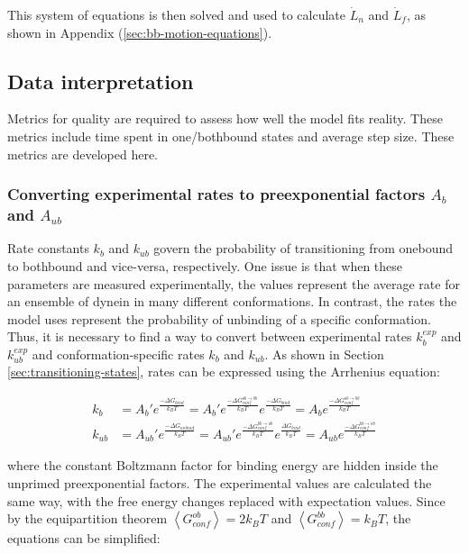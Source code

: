 \documentclass[10pt]{article} %
\begin{document}
This system of equations is then solved and used to calculate $\dot{L}_n$ and $\dot{L}_f$, as shown in Appendix (\ref{sec:bb-motion-equations}).

\subsection{Data interpretation}
Metrics for quality are required to assess how well the model fits reality. These metrics include time spent in one/bothbound states and average step size. These metrics are developed here.\\

\subsubsection{Converting experimental rates to preexponential factors $A_b$ and $A_{ub}$}
Rate constants $k_b$ and $k_{ub}$ govern the probability of transitioning from onebound to bothbound and vice-versa, respectively. One issue is that when these parameters are measured experimentally, the values represent the average rate for an ensemble of dynein in many different conformations. In contrast, the rates the model uses represent the probability of unbinding of a specific conformation. Thus, it is necessary to find a way to convert between experimental rates $k_b^{exp}$ and $k_{ub}^{exp}$ and conformation-specific rates $k_b$ and $k_{ub}$. As shown in Section \ref{sec:transitioning-states}, rates can be expressed using the Arrhenius equation:

\begin{align*}
  k_b &= A_b'e^{\frac{-\Delta G_{bind}}{k_BT}} = A_b'e^{\frac{-\Delta G_{conf}^{ob\rightarrow bb}}{k_BT}}e^{\frac{-\Delta G_{bind}}{k_BT}} = A_be^{\frac{-\Delta G_{conf}^{ob\rightarrow bb}}{k_BT}}\\
  k_{ub} &= A_{ub}'e^{\frac{-\Delta G_{unbind}}{k_BT}} = A_{ub}'e^{\frac{-\Delta G_{conf}^{bb\rightarrow ob}}{k_BT}}e^{\frac{\Delta G_{bind}}{k_BT}} = A_{ub}e^{\frac{-\Delta G_{conf}^{bb\rightarrow ob}}{k_BT}}
\end{align*}

where the constant Boltzmann factor for binding energy are hidden inside the unprimed preexponential factors. The experimental values are calculated the same way, with the free energy changes replaced with expectation values. Since by the equipartition theorem $\left<G_{conf}^{ob}\right> = 2k_BT$ and $\left<G_{conf}^{bb}\right> = k_BT$, the equations can be simplified:
\end{document}
